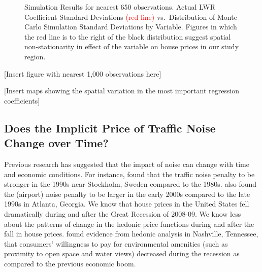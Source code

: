 \documentclass{article}\usepackage{graphicx, color}
\begin{document}
\begin{figure}
 \caption{Simulation Results for nearest 650 observations. Actual LWR Coefficient Standard Deviations \textcolor{red}{(red line)} vs.\ Distribution of Monte Carlo Simulation Standard Deviations by Variable. Figures in which the red line is to the right of the black distribution suggest spatial non-stationarity in effect of the variable on house prices in our study region.}\label{fig:MCsds650}
\end{figure}

[Insert figure with nearest 1,000 observations here]


[Insert maps showing the spatial variation in the most important regression coefficients]

\subsection{Does the Implicit Price of Traffic Noise Change over Time?}

Previous research has suggested that the impact of noise can change with time and economic conditions. For instance, \citet{Wilhelmsson2000} found that the traffic noise penalty to be stronger in the 1990s near Stockholm, Sweden compared to the 1980s. \citet{Cohen2009} also found the (airport) noise penalty to be larger in the early 2000s compared to the late 1990s in Atlanta, Georgia. We know that house prices in the United States fell dramatically during and after the Great Recession of 2008-09. We know less about the patterns of change in the hedonic price functions during and after the fall in house prices. \citet{Cho2011b} found evidence from hedonic analysis in Nashville, Tennessee, that consumers' willingness to pay for environmental amenities (such as proximity to open space and water views) decreased during the recession as compared to the previous economic boom. 
\end{document}
